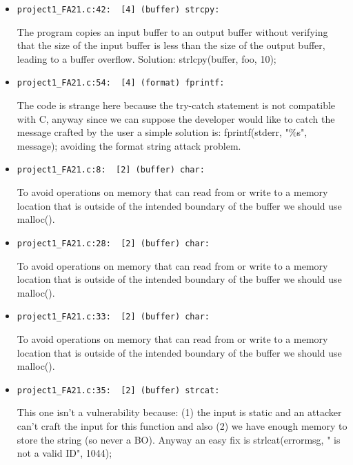 \documentclass{article}
\begin{document}
\begin{itemize}

\item 
\begin{verbatim}
project1_FA21.c:42:  [4] (buffer) strcpy:
\end{verbatim}
The program copies an input buffer to an output buffer without verifying that the size of the input buffer is less than the size of the output buffer, leading to a buffer overflow.
Solution: strlcpy(buffer, foo, 10);

\item 
\begin{verbatim}
project1_FA21.c:54:  [4] (format) fprintf:
\end{verbatim}
The code is strange here because the try-catch statement is not compatible with C, anyway since we can suppose the developer would like to catch the message crafted by the user a simple solution is: fprintf(stderr, "\%s", message); avoiding the format string attack problem.

\item 
\begin{verbatim}
project1_FA21.c:8:  [2] (buffer) char:
\end{verbatim}
To avoid operations on memory that can read from or write to a memory location that is outside of the intended boundary of the buffer we should use malloc().

\item 
\begin{verbatim}
project1_FA21.c:28:  [2] (buffer) char:
\end{verbatim}
To avoid operations on memory that can read from or write to a memory location that is outside of the intended boundary of the buffer we should use malloc().

\item 
\begin{verbatim}
project1_FA21.c:33:  [2] (buffer) char:
\end{verbatim}
To avoid operations on memory that can read from or write to a memory location that is outside of the intended boundary of the buffer we should use malloc().

\item 
\begin{verbatim}
project1_FA21.c:35:  [2] (buffer) strcat:
\end{verbatim}
This one isn't a vulnerability because: (1) the input is static and an attacker can't craft the input for this function and also (2) we have enough memory to store the string (so never a BO). Anyway an easy fix is strlcat(errormsg, " is not  a valid ID", 1044);


\end{itemize}
\end{document}
